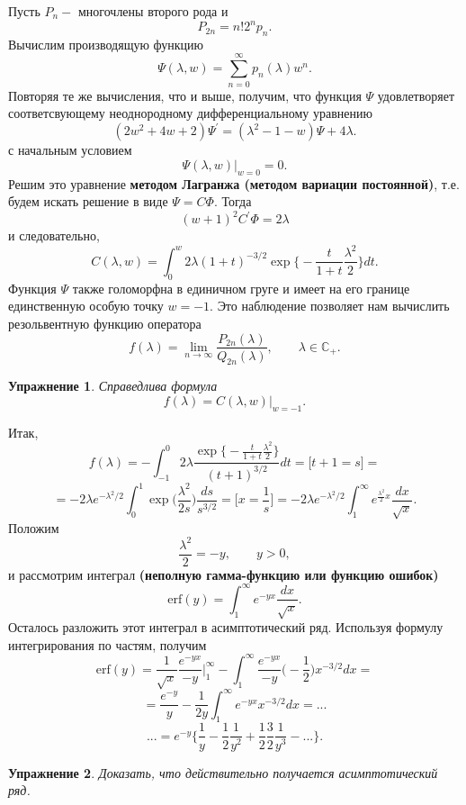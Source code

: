 \documentclass[12 pt, a4 paper]{article}
\theoremstyle{plain}   \newtheorem{Pro}{Задача}
\newtheorem{Exe}{Упражнение}
\begin{document}
Пусть
$ P_n - $
многочлены второго рода и
$$
  P_{2n}=n!2^n p_n .
$$
Вычислим производящую функцию
$$
  \Psi (\lambda , w)=\sum _{n=0}^{\infty}p_n (\lambda )w^n .
$$
Повторяя те же вычисления, что и выше, получим, что
функция
$ \Psi $
удовлетворяет соответсвующему неоднородному дифференциальному
уравнению
$$
  (2w^2 +4w+2)\Psi ^{\prime}=
  (\lambda ^2 -1-w)\Psi +4\lambda .
$$
с начальным условием
$$
  \Psi (\lambda ,w) \biggr | _{w=0}=0.
$$
Решим это уравнение
{\bfseries методом Лагранжа (методом вариации постоянной)},
т.е. будем искать решение в виде
$ \Psi =C\Phi . $
Тогда
$$
  (w+1)^2 C^{\prime}\Phi =2\lambda
$$
и следовательно,
$$
  C(\lambda , w)=\int _0 ^w 2\lambda
  (1+t)^{-3/2}\exp \biggl \{
  -\frac{t}{1+t}\frac{\lambda ^2}{2} \biggr \} dt .
$$
Функция
$ \Psi $
также голоморфна в единичном груге и имеет на его границе
единственную особую точку
$ w=-1. $
Это наблюдение позволяет нам вычислить резольвентную функцию оператора
$$
  f(\lambda )=\lim _{n \rightarrow \infty}
  \frac{P_{2n}(\lambda )}{Q_{2n}(\lambda )},
  \qquad \lambda \in \mathbb{C}_+ .
$$
\begin{Exe}
Справедлива формула
$$
  f(\lambda )=C(\lambda ,w) \biggr | _{w=-1}.
$$
\end{Exe}
Итак,
$$
  f(\lambda )=- \int _{-1}^0 2\lambda
  \frac{\exp \bigl \{ -\frac{t}{1+t}\frac{\lambda ^2}{2}  \bigr \} }
  {(t+1)^{3/2}}dt=
  \biggl [ t+1=s \biggr ] =
$$
$$
  =-2\lambda e^{-\lambda ^2/2}\int _0 ^1 \exp
   \biggl ( \frac{\lambda ^2}{2s}
  \biggr ) \frac{ds}{s^{3/2}}=
  \biggl [ x=\frac{1}{s} \biggr ] =
  -2\lambda e^{-\lambda ^2 /2}
   \int _1 ^{\infty} e^{\frac{\lambda ^2}{2}x}
   \frac{dx}{\sqrt{x}} .
$$
Положим
$$
  \frac{\lambda ^2}{2}=-y, \qquad y>0 ,
$$
и рассмотрим интеграл
{\bfseries (неполную гамма-функцию или функцию ошибок)}
$$
  \mathrm{erf} (y)=\int _1 ^{\infty} e^{-yx}
  \frac{dx}{\sqrt{x}}.
$$
Осталось разложить этот интеграл в асимптотический ряд.
Используя формулу интегрирования по частям, получим
$$
  \mathrm{erf}(y)=
  \frac{1}{\sqrt{x}}\frac{e^{-yx}}{-y} \biggr | _1 ^{\infty} -
  \int _1 ^{\infty}\frac{e^{-yx}}{-y}\biggl (-\frac{1}{2} \biggr )
  x^{-3/2}dx=
$$
$$
  =\frac{e^{-y}}{y} - \frac{1}{2y} \int _1 ^{\infty}
  e^{-yx}x^{-3/2}dx=...
$$
$$
  ...=e^{-y} \biggl \{
  \frac{1}{y} - \frac{1}{2}\frac{1}{y^2}+
  \frac{1}{2}\frac{3}{2} \frac{1}{y^3} -... \biggr \}.
$$
\begin{Exe}
Доказать, что действительно получается асимптотический ряд.
\end{Exe}
\end{document}
